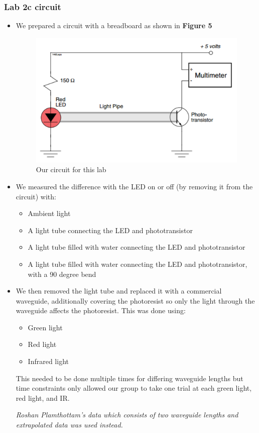 \documentclass{article}
\begin{document}
\subsubsection*{Lab 2c circuit}
\begin{itemize}
\item We prepared a circuit with a breadboard as shown in \textbf{Figure 5}
\begin{figure}[h!]
	\centering
	\includegraphics[scale=0.7]{circuit.png}
	\caption{Our circuit for this lab}
\end{figure}
\item We measured the difference with the LED on or off (by removing it from the circuit) with:
	\begin{itemize}
	\item Ambient light
	\item A light tube connecting the LED and phototransistor
	\item A light tube filled with water connecting the LED and phototransistor
	\item A light tube filled with water connecting the LED and phototransistor, with a 90 degree bend
	\end{itemize}
\item We then removed the light tube and replaced it with a commercial waveguide, additionally covering the photoresist so only the light through the waveguide affects the photoresist. This was done using:
	\begin{itemize}
	\item Green light
	\item Red light
	\item Infrared light
	\end{itemize}
This needed to be done multiple times for differing waveguide lengths but time constraints only allowed our group to take one trial at each green light, red light, and IR. 

\textit{Roshan Plamthottam's data which consists of two waveguide lengths and extrapolated data was used instead.}
\end{itemize}
\end{document}
